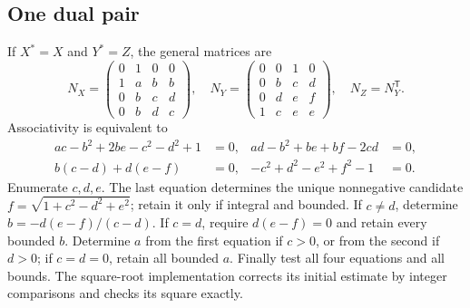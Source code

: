\documentclass[11pt,a4paper]{article}
\theoremstyle{definition}\newtheorem{definition}[theorem]{Definition}\newtheorem{remark}[theorem]{Remark}
\begin{document}
\subsection{One dual pair}
If $X^*=X$ and $Y^*=Z$, the general matrices are
\[
N_X=\begin{pmatrix}0&1&0&0\\1&a&b&b\\0&b&c&d\\0&b&d&c\end{pmatrix},\quad
N_Y=\begin{pmatrix}0&0&1&0\\0&b&c&d\\0&d&e&f\\1&c&e&e\end{pmatrix},\quad
N_Z=N_Y^{\mathsf T}.
\]
Associativity is equivalent to
\begin{align*}
 ac-b^2+2be-c^2-d^2+1&=0,&ad-b^2+be+bf-2cd&=0,\\
 b(c-d)+d(e-f)&=0,&-c^2+d^2-e^2+f^2-1&=0.
\end{align*}
Enumerate $c,d,e$. The last equation determines the unique nonnegative
candidate $f=\sqrt{1+c^2-d^2+e^2}$; retain it only if integral and
bounded. If $c\ne d$, determine $b=-d(e-f)/(c-d)$. If $c=d$, require
$d(e-f)=0$ and retain every bounded $b$. Determine $a$ from the first
equation if $c>0$, or from the second if $d>0$; if $c=d=0$, retain
all bounded $a$. Finally test all four equations and all bounds.
The square-root implementation corrects its initial estimate by integer
comparisons and checks its square exactly.
\end{document}
